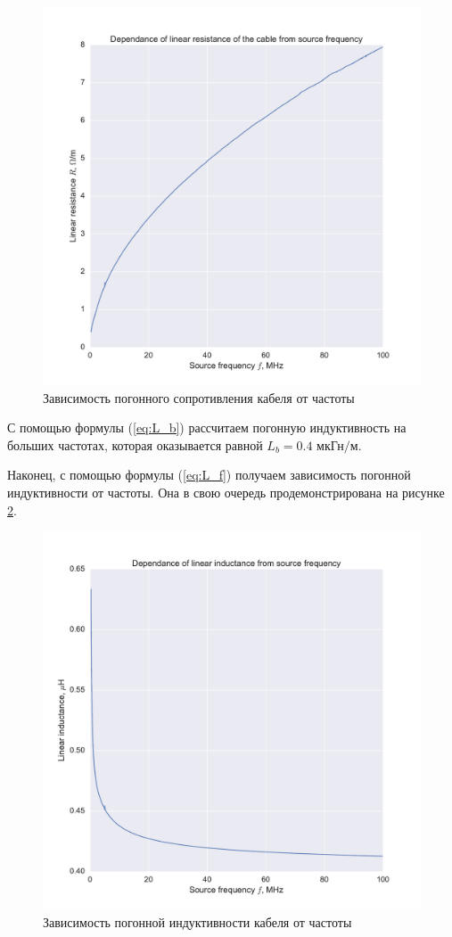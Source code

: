 \documentclass[a4paper, 12pt]{article}
\begin{document}
\begin{figure}[H]
	\centering
	\includegraphics[width=0.7\linewidth]{pt_4_linear.pdf}
	\caption{Зависимость погонного сопротивления кабеля от частоты}
	\label{fig:R_pog}
\end{figure}

С помощью формулы (\ref{eq:L_b}) рассчитаем погонную индуктивность на больших частотах, которая оказывается равной $\boxed{L_b = 0.4 \text{ мкГн/м}}$.

Наконец, с помощью формулы (\ref{eq:L_f}) получаем зависимость погонной индуктивности от частоты. Она в свою очередь продемонстрирована на рисунке \ref{fig:L_pog}.

\begin{figure}[H]
	\centering
	\includegraphics[width=0.7\linewidth]{pt_4_inductance.pdf}
	\caption{Зависимость погонной индуктивности кабеля от частоты}
	\label{fig:L_pog}
\end{figure}
\end{document}
